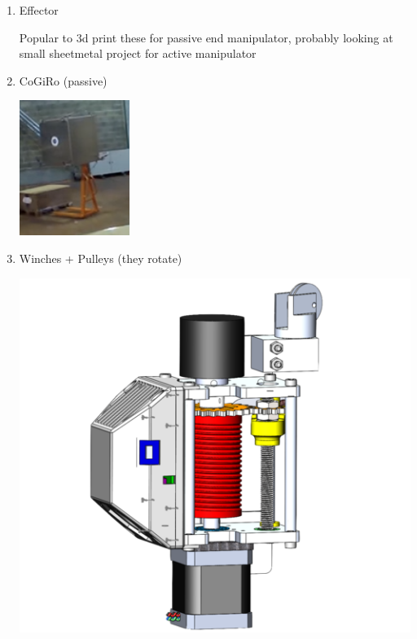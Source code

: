 \documentclass[11pt]{article}
\begin{document}
\begin{enumerate}
\item Effector
\label{sec:org2d1f8e8}

Popular to 3d print these for passive end manipulator, probably looking at small sheetmetal project for active manipulator

\item CoGiRo (passive)
\label{sec:org7bc10ca}
\begin{center}
\includegraphics[width=.9\linewidth]{Hardware_needed/2022-07-18_13-31-45_screenshot.png}
\end{center}

\item Winches + Pulleys (they rotate)
\label{sec:org3ce4f60}

\begin{center}
\includegraphics[width=.9\linewidth]{Hardware_needed/2022-07-18_13-16-45_screenshot.png}
\end{center}


\end{enumerate}
\end{document}
